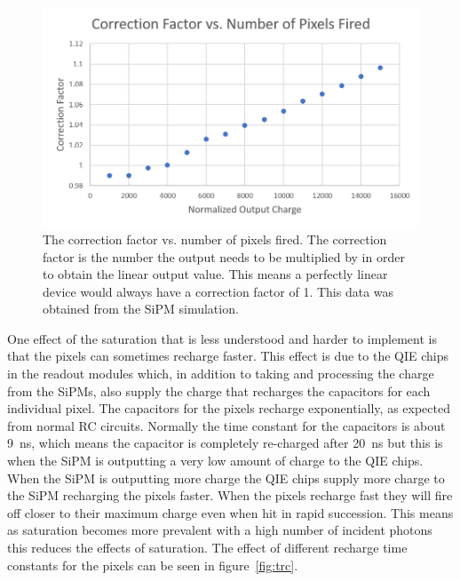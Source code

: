 \begin{figure}
\centering
\includegraphics[width=\linewidth]{Figures/CorFac.png}
\caption{The correction factor vs. number of pixels fired. The correction factor is the number the output needs to be multiplied by in order to obtain the linear output value. This means a perfectly linear device would always have a correction factor of 1. This data was obtained from the SiPM simulation.}
\label{fig:Cor}
\end{figure}

One effect of the saturation that is less understood and harder to implement is that the pixels can sometimes recharge faster. This effect is due to the QIE chips in the readout modules which, in addition to taking and processing the charge from the SiPMs, also supply the charge that recharges the capacitors for each individual pixel. The capacitors for the pixels recharge exponentially, as expected from normal RC circuits. Normally the time constant for the capacitors is about 9~ns, which means the capacitor is completely re-charged after 20~ns but this is when the SiPM is outputting a very low amount of charge to the QIE chips. When the SiPM is outputting more charge the QIE chips supply more charge to the SiPM recharging the pixels faster. When the pixels recharge fast they will fire off closer to their maximum charge even when hit in rapid succession. This means as saturation becomes more prevalent with a high number of incident photons this reduces the effects of saturation. The effect of different recharge time constants for the pixels can be seen in figure~\ref{fig:trc}.

